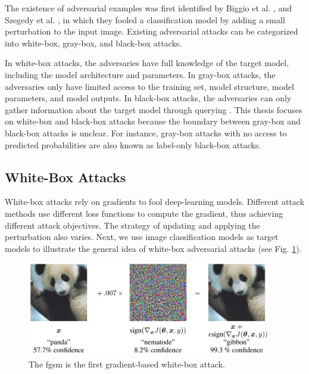 The existence of adversarial examples was first identified by Biggio et al. \citep{biggio2013evasion}, and Szegedy et al. \citep{szegedy2013intriguing}, in which they fooled a classification model by adding a small perturbation to the input image. Existing adversarial attacks can be categorized into white-box, gray-box, and black-box attacks. 

In white-box attacks, the adversaries have full knowledge of the target model, including the model architecture and parameters. In gray-box attacks, the adversaries only have limited access to the training set, model structure, model parameters, and model outputs. In black-box attacks, the adversaries can only gather information about the target model through querying \citep{REN2020346}. This thesis focuses on white-box and black-box attacks because the boundary between gray-box and black-box attacks is unclear. For instance, gray-box attacks with no access to predicted probabilities are also known as label-only black-box attacks.


\subsection{White-Box Attacks}
\label{sec:whitebox_attack}

White-box attacks rely on gradients to fool deep-learning models. Different attack methods use different loss functions to compute the gradient, thus achieving different attack objectives. The strategy of updating and applying the perturbation also varies. Next, we use image classification models as target models to illustrate the general idea of white-box adversarial attacks (see Fig. \ref{fig.adv_perturb}).

\begin{figure}[H]
\centering
\includegraphics[width=0.95\textwidth]{figures/chapter_intro/fgsm.jpg}
\caption{The \acrfull{fgsm}\citep{goodfellow2015explaining} is the first gradient-based white-box attack.}
\label{fig.adv_perturb}
\end{figure}

